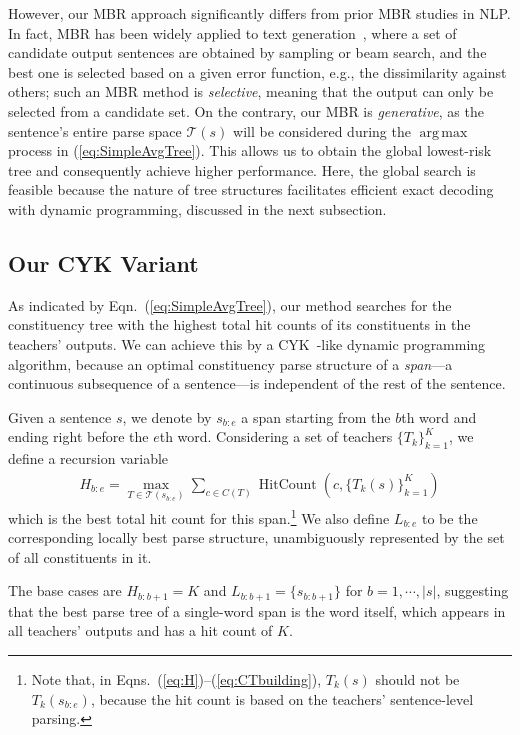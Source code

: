 \documentclass{article}
\DeclareMathOperator*{\argmax}{arg\,max}
\begin{document}
However, our MBR approach significantly differs from prior MBR studies in NLP. In fact, MBR has been widely applied to text generation~\citep{kumar-byrne-2004-minimum,10.1162/tacl_a_00491,suzgun-etal-2023-follow}, where a set of candidate output sentences are obtained by sampling or beam search, and the best one is selected based on a given error function, e.g., the dissimilarity against others; such an MBR method is \textit{selective}, meaning that the output can only be selected from a candidate set. On the contrary, our MBR is \textit{generative}, as the sentence's entire parse space $\mathcal T(s)$ will be considered during the $\argmax$ process in (\ref{eq:SimpleAvgTree}). This allows us to obtain the global lowest-risk tree and consequently achieve higher performance. 
Here, the global search is feasible because the nature of tree structures facilitates efficient exact decoding with dynamic programming, discussed in the next subsection.

\subsection{Our CYK Variant}\label{Sec:OurCYK}

As indicated by Eqn.~(\ref{eq:SimpleAvgTree}), our method searches for the constituency tree with the highest total hit counts of its constituents in the teachers' outputs. We can achieve this by a CYK~\citep{Kasami1965AnER,YOUNGER1967189}-like dynamic programming algorithm, because an optimal constituency parse structure of a \textit{span}---a continuous subsequence of a sentence---is independent of the rest of the sentence.

Given a sentence $s$, we denote by $s_{b:e}$ a span starting from the $b$th word and ending right before the $e$th word. Considering a set of teachers $\{T_k\}_{k=1}^K$, we define a recursion variable 
\begin{align}\label{eq:H}
H_{b:e}=\max_{T\in\mathcal T({s_{b:e}})}\sum_{c\in C(T)}\operatorname{HitCount}(c, \{T_k(s)\}_{k=1}^K)
\end{align}
which is the best total hit count for this span.\footnote{Note that, in Eqns.~(\ref{eq:H})--(\ref{eq:CTbuilding}), $T_k(s)$ should not be $T_k(s_{b:e})$, because the hit count is based on the teachers' sentence-level parsing.} We also define $L_{b:e}$ to be the corresponding locally best parse structure, unambiguously represented by the set of all constituents in it.

The base cases are $H_{b:b+1} = K$ and $L_{b:b+1}=\{s_{b:b+1}\}$ for $b=1,\cdots, |s|$, suggesting that the best parse tree of a single-word span is the word itself, which appears in all teachers' outputs and has a hit count of $K$.
\end{document}

